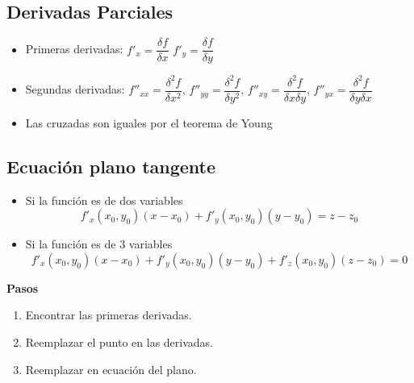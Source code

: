 \subsection{Derivadas Parciales}
\begin{itemize}
	\item Primeras derivadas: $f'_x=\dfrac{\delta f}{\delta x}$ $f'_y=\dfrac{\delta f}{\delta y}$
	\item Segundas derivadas: $f''_{xx}=\dfrac{\delta^2 f}{\delta x^2}$, $f''_{yy}=\dfrac{\delta^2 f}{\delta y^2}$, $f''_{xy}=\dfrac{\delta^2 f}{\delta x\delta y}$, $f''_{yx}=\dfrac{\delta^2 f}{\delta y\delta x}$
	\item Las cruzadas son iguales por el teorema de Young
\end{itemize}
\subsection{Ecuación plano tangente}

\begin{itemize}
	\item Si la función es de dos variables
	$$f'_x(x_0,y_0)(x-x_0)+f'_y(x_0,y_0)(y-y_0)=z-z_0$$
	\item Si la función es de 3 variables
	$$f'_x(x_0,y_0)(x-x_0)+f'_y(x_0,y_0)(y-y_0)+f'_z(x_0,y_0)(z-z_0)=0$$	
\end{itemize}

\textbf{Pasos}

\begin{enumerate}
	\item Encontrar las primeras derivadas.
	\item Reemplazar el punto en las derivadas.
	\item Reemplazar en ecuación del plano.
\end{enumerate}

